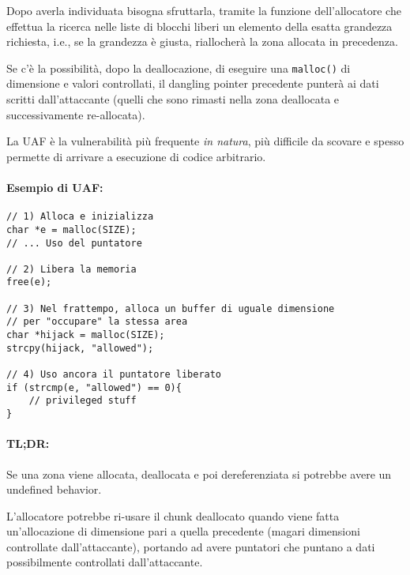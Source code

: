 Dopo averla individuata bisogna sfruttarla, tramite la funzione dell'allocatore che effettua la ricerca nelle liste di blocchi liberi un elemento della esatta grandezza richiesta, i.e., se la grandezza è giusta, riallocherà la zona allocata in precedenza.

Se c'è la possibilità, dopo la deallocazione, di eseguire una \texttt{malloc()} di dimensione e valori controllati, il dangling pointer precedente punterà ai dati scritti dall'attaccante (quelli che sono rimasti nella zona deallocata e successivamente re-allocata). 

La UAF è la vulnerabilità più frequente \textit{in natura}, più difficile da scovare e spesso permette di arrivare a esecuzione di codice arbitrario.

\paragraph{Esempio di UAF:}
\begin{verbatim}
// 1) Alloca e inizializza
char *e = malloc(SIZE);
// ... Uso del puntatore

// 2) Libera la memoria
free(e);

// 3) Nel frattempo, alloca un buffer di uguale dimensione
// per "occupare" la stessa area
char *hijack = malloc(SIZE);
strcpy(hijack, "allowed");

// 4) Uso ancora il puntatore liberato
if (strcmp(e, "allowed") == 0){
    // privileged stuff
}
\end{verbatim}

\vfill

\paragraph{TL;DR:} Se una zona viene allocata, deallocata e poi dereferenziata si potrebbe avere un undefined behavior.

L'allocatore potrebbe ri-usare il chunk deallocato quando viene fatta un'allocazione di dimensione pari a quella precedente (magari dimensioni controllate dall'attaccante), portando ad avere puntatori che puntano a dati possibilmente controllati dall'attaccante.

